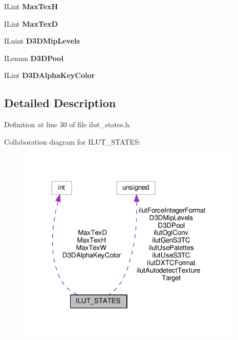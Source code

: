 \begin{DoxyCompactItemize}
I\+Lint {\bfseries Max\+TexH}
\item 
\mbox{\label{structILUT__STATES_a96a7b3c9c0a7d595a66a55f432eb22fd}} 
I\+Lint {\bfseries Max\+TexD}
\item 
\mbox{\label{structILUT__STATES_a2dc9a1b04aa49a5642606f419b7ce022}} 
I\+Luint {\bfseries D3\+D\+Mip\+Levels}
\item 
\mbox{\label{structILUT__STATES_ab530ce0167ebe1f23a55536485cab6fb}} 
I\+Lenum {\bfseries D3\+D\+Pool}
\item 
\mbox{\label{structILUT__STATES_a451ff81cbf047dd8561087ab3673b361}} 
I\+Lint {\bfseries D3\+D\+Alpha\+Key\+Color}
\end{DoxyCompactItemize}


\subsection{Detailed Description}


Definition at line 30 of file ilut\+\_\+states.\+h.



Collaboration diagram for I\+L\+U\+T\+\_\+\+S\+T\+A\+T\+ES\+:
\nopagebreak
\begin{figure}[H]
\begin{center}
\leavevmode
\includegraphics[width=307pt]{de/db8/structILUT__STATES__coll__graph}
\end{center}
\end{figure}


